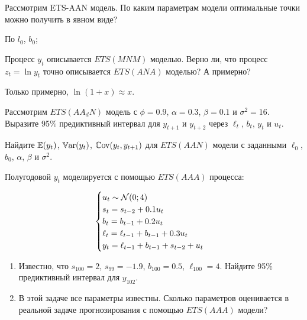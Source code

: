 \begin{problem}
Рассмотрим ETS-AAN модель. По каким параметрам модели оптимальные точки можно получить в явном виде?
\begin{sol}
По $l_0$, $b_0$;
\end{sol}
\end{problem}

\begin{problem}
Процесс $y_t$ описывается $ETS(MNM)$ моделью. 
Верно ли, что процесс $z_t = \ln y_t$ точно описывается $ETS(ANA)$ моделью? А примерно?
\begin{sol}
  Только примерно, $\ln (1 + x) \approx x$.
\end{sol}
\end{problem}
  

\begin{problem}
Рассмотрим $ETS(AA_dN)$ модель с $\phi = 0.9$, $\alpha=0.3$, $\beta=0.1$ и $\sigma^2=16$. 
Выразите 95\% предиктивный интервал для $y_{t+1}$ и $y_{t+2}$ через $\ell_t$, $b_t$, $y_t$ и $u_t$. 
\begin{sol}
\end{sol}
\end{problem}

\begin{problem}
Найдите $\operatorname{\mathbb{E}}(y_t)$, $\operatorname{\mathbb{V}\mathrm{ar}}(y_t)$, $\operatorname{\mathbb{C}\mathrm{ov}}(y_t, y_{t+1})$ для $ETS(AAN)$ модели с заданными $\ell_0$, $b_0$, $\alpha$, $\beta$ и $\sigma^2$.
\begin{sol}
\end{sol}
\end{problem}


\begin{problem}
Полугодовой $y_t$ моделируется с помощью $ETS(AAA)$ процесса:
    
\[
\begin{cases}
    u_t \sim \mathcal{N}(0; 4) \\
    s_t = s_{t-2} + 0.1 u_t \\
    b_t = b_{t-1} + 0.2 u_t \\
    \ell_t = \ell_{t-1} + b_{t-1} + 0.3 u_t \\
    y_t = \ell_{t-1} + b_{t-1} + s_{t-2} + u_t \\
\end{cases}    
\]

\begin{enumerate}
    \item Известно, что $s_{100} = 2$, $s_{99} = -1.9$, $b_{100} = 0.5$, $\ell_{100} = 4$. Найдите 95\% предиктивный интервал для $y_{102}$. 
    \item В этой задаче все параметры известны. Сколько параметров оценивается в реальной задаче прогнозирования с помощью $ETS(AAA)$ модели?
\end{enumerate}
\begin{sol}
\end{sol}
\end{problem}

